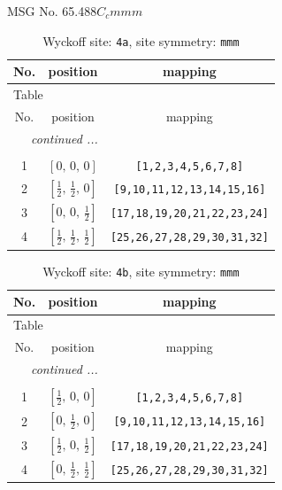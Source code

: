 \documentclass[fleqn,8pt]{jsarticle}
\begin{document}
\setcounter{MaxMatrixCols}{32}

\renewcommand{\tablename}{Table~}
\renewcommand{\figurename}{Figure~}
\begin{center}
\LARGE
MSG No. 65.488\quad$C_{c}mmm$
\end{center}
\renewcommand{\arraystretch}{1.2}
\begin{longtable}{ccc}
\caption{Wyckoff site: {\tt 4a}, site symmetry: {\tt mmm}}
 \\
 \hline \hline
No. & position & mapping \\ \hline \endfirsthead

\multicolumn{2}{l}{\tablename\ \thetable{}} \\
 \hline \hline
No. & position & mapping \\ \hline \endhead

 \hline \hline
\multicolumn{2}{r}{\footnotesize\it continued ...} \\ \endfoot

 \hline \hline
\multicolumn{2}{r}{} \\ \endlastfoot

1 & $\left[ 0,\, 0,\, 0 \right]$ & {\tt [1,2,3,4,5,6,7,8]} \\ \hline
2 & $\left[ \frac{1}{2},\, \frac{1}{2},\, 0 \right]$ & {\tt [9,10,11,12,13,14,15,16]} \\ \hline
3 & $\left[ 0,\, 0,\, \frac{1}{2} \right]$ & {\tt [17,18,19,20,21,22,23,24]} \\ \hline
4 & $\left[ \frac{1}{2},\, \frac{1}{2},\, \frac{1}{2} \right]$ & {\tt [25,26,27,28,29,30,31,32]} \\
\end{longtable}
\renewcommand{\arraystretch}{1.2}
\begin{longtable}{ccc}
\caption{Wyckoff site: {\tt 4b}, site symmetry: {\tt mmm}}
 \\
 \hline \hline
No. & position & mapping \\ \hline \endfirsthead

\multicolumn{2}{l}{\tablename\ \thetable{}} \\
 \hline \hline
No. & position & mapping \\ \hline \endhead

 \hline \hline
\multicolumn{2}{r}{\footnotesize\it continued ...} \\ \endfoot

 \hline \hline
\multicolumn{2}{r}{} \\ \endlastfoot

1 & $\left[ \frac{1}{2},\, 0,\, 0 \right]$ & {\tt [1,2,3,4,5,6,7,8]} \\ \hline
2 & $\left[ 0,\, \frac{1}{2},\, 0 \right]$ & {\tt [9,10,11,12,13,14,15,16]} \\ \hline
3 & $\left[ \frac{1}{2},\, 0,\, \frac{1}{2} \right]$ & {\tt [17,18,19,20,21,22,23,24]} \\ \hline
4 & $\left[ 0,\, \frac{1}{2},\, \frac{1}{2} \right]$ & {\tt [25,26,27,28,29,30,31,32]} \\
\end{longtable}
\end{document}
